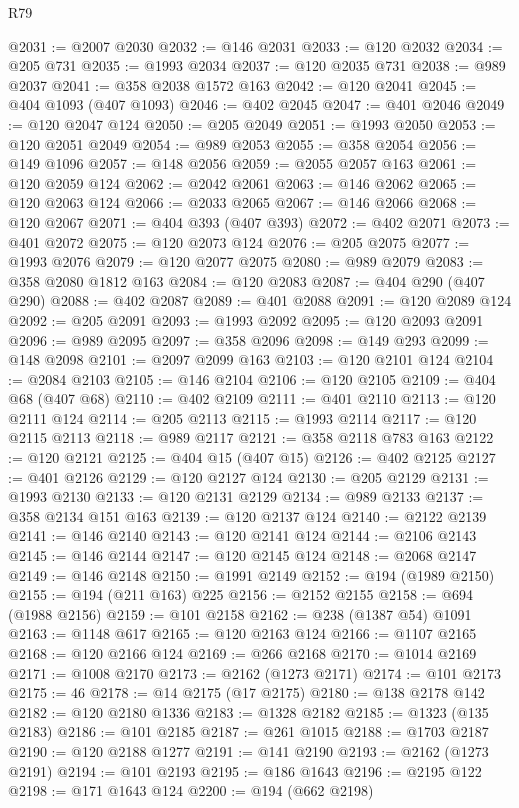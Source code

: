 \begin{lexlean}{R79}
\begin{coremodule}
@2031 := @2007 @2030
@2032 := @146 @2031
@2033 := @120 @2032
@2034 := @205 @731
@2035 := @1993 @2034
@2037 := @120 @2035 @731
@2038 := @989 @2037
@2041 := @358 @2038 @1572 @163
@2042 := @120 @2041
@2045 := @404 @1093 (@407 @1093)
@2046 := @402 @2045
@2047 := @401 @2046
@2049 := @120 @2047 @124
@2050 := @205 @2049
@2051 := @1993 @2050
@2053 := @120 @2051 @2049
@2054 := @989 @2053
@2055 := @358 @2054
@2056 := @149 @1096
@2057 := @148 @2056
@2059 := @2055 @2057 @163
@2061 := @120 @2059 @124
@2062 := @2042 @2061
@2063 := @146 @2062
@2065 := @120 @2063 @124
@2066 := @2033 @2065
@2067 := @146 @2066
@2068 := @120 @2067
@2071 := @404 @393 (@407 @393)
@2072 := @402 @2071
@2073 := @401 @2072
@2075 := @120 @2073 @124
@2076 := @205 @2075
@2077 := @1993 @2076
@2079 := @120 @2077 @2075
@2080 := @989 @2079
@2083 := @358 @2080 @1812 @163
@2084 := @120 @2083
@2087 := @404 @290 (@407 @290)
@2088 := @402 @2087
@2089 := @401 @2088
@2091 := @120 @2089 @124
@2092 := @205 @2091
@2093 := @1993 @2092
@2095 := @120 @2093 @2091
@2096 := @989 @2095
@2097 := @358 @2096
@2098 := @149 @293
@2099 := @148 @2098
@2101 := @2097 @2099 @163
@2103 := @120 @2101 @124
@2104 := @2084 @2103
@2105 := @146 @2104
@2106 := @120 @2105
@2109 := @404 @68 (@407 @68)
@2110 := @402 @2109
@2111 := @401 @2110
@2113 := @120 @2111 @124
@2114 := @205 @2113
@2115 := @1993 @2114
@2117 := @120 @2115 @2113
@2118 := @989 @2117
@2121 := @358 @2118 @783 @163
@2122 := @120 @2121
@2125 := @404 @15 (@407 @15)
@2126 := @402 @2125
@2127 := @401 @2126
@2129 := @120 @2127 @124
@2130 := @205 @2129
@2131 := @1993 @2130
@2133 := @120 @2131 @2129
@2134 := @989 @2133
@2137 := @358 @2134 @151 @163
@2139 := @120 @2137 @124
@2140 := @2122 @2139
@2141 := @146 @2140
@2143 := @120 @2141 @124
@2144 := @2106 @2143
@2145 := @146 @2144
@2147 := @120 @2145 @124
@2148 := @2068 @2147
@2149 := @146 @2148
@2150 := @1991 @2149
@2152 := @194 (@1989 @2150)
@2155 := @194 (@211 @163) @225
@2156 := @2152 @2155
@2158 := @694 (@1988 @2156)
@2159 := @101 @2158
@2162 := @238 (@1387 @54) @1091
@2163 := @1148 @617
@2165 := @120 @2163 @124
@2166 := @1107 @2165
@2168 := @120 @2166 @124
@2169 := @266 @2168
@2170 := @1014 @2169
@2171 := @1008 @2170
@2173 := @2162 (@1273 @2171)
@2174 := @101 @2173
@2175 := 46
@2178 := @14 @2175 (@17 @2175)
@2180 := @138 @2178 @142
@2182 := @120 @2180 @1336
@2183 := @1328 @2182
@2185 := @1323 (@135 @2183)
@2186 := @101 @2185
@2187 := @261 @1015
@2188 := @1703 @2187
@2190 := @120 @2188 @1277
@2191 := @141 @2190
@2193 := @2162 (@1273 @2191)
@2194 := @101 @2193
@2195 := @186 @1643
@2196 := @2195 @122
@2198 := @171 @1643 @124
@2200 := @194 (@662 @2198)

\end{coremodule}
\end{lexlean}
